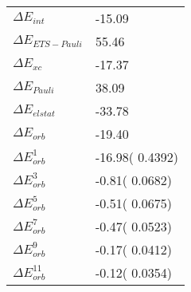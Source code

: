 \begin{table}[]
\caption{}
\label{}
\begin{tabular}{ll}
\hline
$\Delta E_{int}$          &       -15.09   \\
$\Delta E_{ETS-Pauli}$    &        55.46   \\
$\Delta E_{xc}$           &       -17.37   \\
$\Delta E_{Pauli}$        &        38.09   \\
$\Delta E_{elstat}$       &       -33.78   \\
$\Delta E_{orb}$          &       -19.40   \\
$\Delta E^{1}_{orb}$      &       -16.98(      0.4392)   \\
$\Delta E^{3}_{orb}$      &        -0.81(      0.0682)   \\
$\Delta E^{5}_{orb}$      &        -0.51(      0.0675)   \\
$\Delta E^{7}_{orb}$      &        -0.47(      0.0523)   \\
$\Delta E^{9}_{orb}$      &        -0.17(      0.0412)   \\
$\Delta E^{11}_{orb}$     &        -0.12(      0.0354)   \\
\end{tabular}
\end{table}
